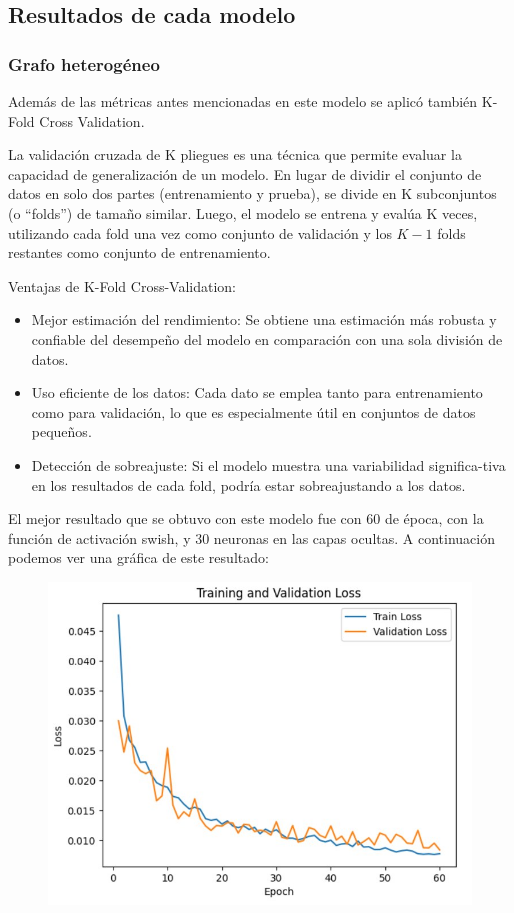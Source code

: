 \documentclass{article}
\begin{document}
\subsection{Resultados de cada modelo}
\subsubsection{Grafo heterogéneo}
Además de las métricas antes mencionadas en este modelo se aplicó también K-Fold Cross Validation.

La validación cruzada de K pliegues es una técnica que permite evaluar la capacidad de generalización de un modelo. En lugar de
dividir el conjunto de datos en solo dos partes (entrenamiento y prueba), se divide en K subconjuntos (o “folds”) de tamaño similar.
Luego, el modelo se entrena y evalúa K veces, utilizando cada fold una vez como conjunto de validación y los \(K-1\) folds restantes como
conjunto de entrenamiento.

Ventajas de K-Fold Cross-Validation:
\begin{itemize}
    \item Mejor estimación del rendimiento: Se obtiene una estimación más robusta y confiable del desempeño del modelo en comparación con una sola división de datos.
    \item Uso eficiente de los datos: Cada dato se emplea tanto para entrenamiento como para validación, lo que es especialmente útil en conjuntos de datos pequeños.
    \item Detección de sobreajuste: Si el modelo muestra una variabilidad significa-tiva en los resultados de cada fold, podría estar sobreajustando a los datos.
\end{itemize}


\newpage

El mejor resultado que se obtuvo con este modelo fue con 60 de época, con la función de activación swish, y 30 neuronas en las capas ocultas. A continuación podemos ver una
gráfica de este resultado:

\begin{figure}[h]
    \centering
    \includegraphics[width=12cm]{result.jpg}
\end{figure}
\end{document}
